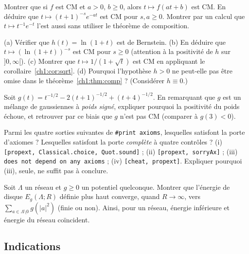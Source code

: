 \begin{exercise}[*]\label{ch1:ex:clotures}
Montrer que si $f$ est CM et $a>0$, $b\ge0$, alors $t\mapsto f(at+b)$ est CM. En déduire que $t\mapsto(t+1)^{-s}e^{-a t}$ est CM pour $s,a\ge0$.
Montrer par un calcul que $t\mapsto t^{-1}e^{-t}$ l'est aussi sans utiliser le théorème de composition.
\end{exercise}

\begin{exercise}[**]\label{ch1:ex:comp}
(a) Vérifier que $h(t)=\ln(1+t)$ est de Bernstein. (b) En déduire que $t\mapsto(\ln(1+t))^{-s}$ est CM pour $s\ge0$ (attention à la positivité de $h$ sur $]0,\infty[$).
(c) Montrer que $t\mapsto1/(1+\sqrt t)$ est CM en appliquant le corollaire~\ref{ch1:cor:sqrt}.
(d) Pourquoi l'hypothèse $h>0$ ne peut-elle pas être omise dans le théorème~\ref{ch1:thm:comp} ? (Considérer $h\equiv0$.)
\end{exercise}

\begin{exercise}[***]\label{ch1:ex:melange}
Soit $g(t)=t^{-1/2}-2(t+1)^{-1/2}+(t+4)^{-1/2}$. En remarquant que $g$ est un mélange de gaussiennes à \emph{poids signé}, expliquer pourquoi la positivité du poids échoue,
et retrouver par ce biais que $g$ n'est pas CM (comparer à $g(3)<0$).
\end{exercise}

\begin{exercise}[*]\label{ch1:ex:lean}
Parmi les quatre sorties suivantes de \texttt{\#print axioms}, lesquelles satisfont la porte d'axiomes ? Lesquelles satisfont la porte \emph{complète} à quatre contrôles ?
(i) \texttt{[propext, Classical.choice, Quot.sound]} ; (ii) \texttt{[propext, sorryAx]} ; (iii) \texttt{does not depend on any axioms} ; (iv) \texttt{[cheat, propext]}.
Expliquer pourquoi (iii), seule, ne suffit pas à conclure.
\end{exercise}

\begin{exercise}[**]\label{ch1:ex:fatou}
Soit $\Lambda$ un réseau et $g\ge0$ un potentiel quelconque. Montrer que l'énergie de disque $E_g(\Lambda;R)$ définie plus haut converge, quand $R\to\infty$,
vers $\sum_{a\in\Lambda\setminus0}g(|a|^2)$ (finie ou non). Ainsi, pour un réseau, énergie inférieure et énergie du réseau coïncident.
\end{exercise}

\subsection*{Indications}

